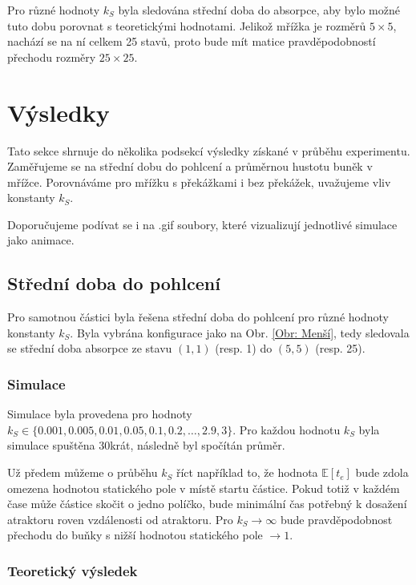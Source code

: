\documentclass[a4paper, 12pt, fleqn]{article}
\begin{document}
	Pro různé hodnoty $k_S$ byla sledována střední doba do absorpce, aby bylo možné tuto dobu porovnat s teoretickými hodnotami. Jelikož mřížka je rozměrů $5 \times 5$, nachází se na ní celkem 25 stavů, proto bude mít matice pravděpodobností přechodu rozměry $25 \times 25$.
	
	\section{Výsledky}
	
	Tato sekce shrnuje do několika podsekcí výsledky získané v průběhu experimentu. Zaměřujeme se na střední dobu do pohlcení a průměrnou hustotu buněk v mřížce. Porovnáváme pro mřížku s překážkami i bez překážek, uvažujeme vliv konstanty $k_S$.
	
	Doporučujeme podívat se i na .gif soubory, které vizualizují jednotlivé simulace jako animace.
	
	\subsection{Střední doba do pohlcení}
	
	Pro samotnou částici byla řešena střední doba do pohlcení pro různé hodnoty konstanty $k_S$. Byla vybrána konfigurace jako na Obr. \ref{Obr: Menší}, tedy sledovala se střední doba absorpce ze stavu $(1,1)$ (resp. 1) do $(5,5)$ (resp. 25).
	
	\subsubsection{Simulace}
	
	Simulace byla provedena pro hodnoty $k_S \in \{0.001,0.005,0.01,0.05,0.1,0.2,\dots,2.9,3\}$. Pro každou hodnotu $k_S$ byla simulace spuštěna 30krát, následně byl spočítán průměr.
	
	Už předem můžeme o průběhu $k_S$ říct například to, že hodnota $\mathbb{E}\left[t_e \right]$ bude zdola omezena hodnotou statického pole v místě startu částice. Pokud totiž v každém čase může částice skočit o jedno políčko, bude minimální čas potřebný k dosažení atraktoru roven vzdálenosti od atraktoru. Pro $k_S \rightarrow \infty$ bude pravděpodobnost přechodu do buňky s nižší hodnotou statického pole $\rightarrow 1$.
	
	\subsubsection{Teoretický výsledek}
	
\end{document}
